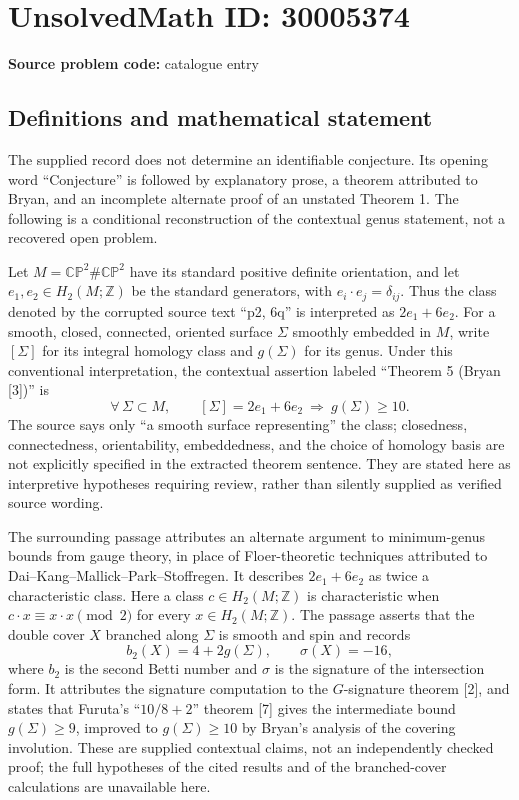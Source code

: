 \documentclass[11pt]{article}
\newcommand{\Z}{\mathbb{Z}}
\begin{document}
\section*{UnsolvedMath ID: 30005374}
\textbf{Source problem code:} catalogue entry
\subsection{Definitions and mathematical statement}
The supplied record does not determine an identifiable conjecture. Its opening word ``Conjecture'' is followed by explanatory prose, a theorem attributed to Bryan, and an incomplete alternate proof of an unstated Theorem 1. The following is a conditional reconstruction of the contextual genus statement, not a recovered open problem.

Let \(M=\mathbb{CP}^{2}\#\mathbb{CP}^{2}\) have its standard positive definite orientation, and let \(e_1,e_2\in H_2(M;\Z)\) be the standard generators, with \(e_i\cdot e_j=\delta_{ij}\). Thus the class denoted by the corrupted source text ``p2, 6q'' is interpreted as \(2e_1+6e_2\). For a smooth, closed, connected, oriented surface \(\Sigma\) smoothly embedded in \(M\), write \([\Sigma]\) for its integral homology class and \(g(\Sigma)\) for its genus. Under this conventional interpretation, the contextual assertion labeled ``Theorem 5 (Bryan [3])'' is
\[
\forall\,\Sigma\subset M,\qquad [\Sigma]=2e_1+6e_2\ \Longrightarrow\ g(\Sigma)\geq 10.
\]
The source says only ``a smooth surface representing'' the class; closedness, connectedness, orientability, embeddedness, and the choice of homology basis are not explicitly specified in the extracted theorem sentence. They are stated here as interpretive hypotheses requiring review, rather than silently supplied as verified source wording.

The surrounding passage attributes an alternate argument to minimum-genus bounds from gauge theory, in place of Floer-theoretic techniques attributed to Dai--Kang--Mallick--Park--Stoffregen. It describes \(2e_1+6e_2\) as twice a characteristic class. Here a class \(c\in H_2(M;\Z)\) is characteristic when \(c\cdot x\equiv x\cdot x\pmod 2\) for every \(x\in H_2(M;\Z)\). The passage asserts that the double cover \(X\) branched along \(\Sigma\) is smooth and spin and records
\[
 b_2(X)=4+2g(\Sigma),\qquad \sigma(X)=-16,
\]
where \(b_2\) is the second Betti number and \(\sigma\) is the signature of the intersection form. It attributes the signature computation to the \(G\)-signature theorem [2], and states that Furuta's ``\(10/8+2\)'' theorem [7] gives the intermediate bound \(g(\Sigma)\geq9\), improved to \(g(\Sigma)\geq10\) by Bryan's analysis of the covering involution. These are supplied contextual claims, not an independently checked proof; the full hypotheses of the cited results and of the branched-cover calculations are unavailable here.
\end{document}
